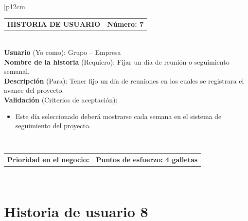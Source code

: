 \documentclass[11pt,letterpaper]{report}
\begin{document}
	\begin{center}	
		\begin{tabular}{|p{12cm}|}
			\hline
			\begin{tabular}{c|c}
				\textbf{HISTORIA DE USUARIO} & \textbf{Número: 7} \\
			\end{tabular} \\ \hline
			\textbf{Usuario} (Yo como): Grupo – Empresa \\ \hline
			\textbf{Nombre de la historia} (Requiero): Fijar un día de reunión o seguimiento semanal. \\ \hline
			\textbf{Descripción} (Para): Tener fijo un día de reuniones en los cuales se registrara el avance del proyecto. \\ \hline
			\textbf{Validación} (Criterios de aceptación): \\
			\begin{minipage}{12cm}
				\begin{itemize}
					\item Este día seleccionado deberá mostrarse cada semana en el sistema de seguimiento del proyecto.
				\end{itemize}
			\end{minipage} \\ \hline
			\begin{tabular}{p{6cm}|c}
				\textbf{Prioridad en el negocio: } & \textbf{Puntos de esfuerzo: 4 galletas} \\
			\end{tabular} \\ \hline
		\end{tabular}
	\end{center}
	
	\section{Historia de usuario 8}
	
\end{document}
